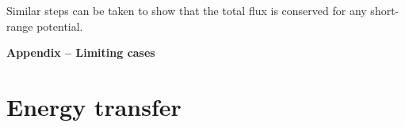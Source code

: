 Similar steps can be taken to show that the total flux is conserved for any short-range potential. 









{\bf Appendix -- Limiting cases}

\section{Energy transfer}
\label{sec:transfer}
